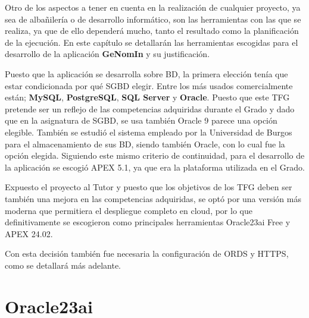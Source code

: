 
Otro de los aspectos a tener en cuenta en la realización de cualquier proyecto, ya sea de albañilería o de desarrollo informático, son las herramientas con las que se realiza, ya que de ello dependerá mucho, tanto el resultado como la planificación de la ejecución.
En este capítulo se detallarán las herramientas escogidas para el desarrollo de la aplicación \textbf{GeNomIn} y su justificación.

Puesto que la aplicación se desarrolla sobre BD, la primera elección tenía que estar condicionada por qué \acrshort{SGBD} elegir. Entre los más usados comercialmente están; \textbf{MySQL}, \textbf{PostgreSQL}, \textbf{SQL Server} y \textbf{Oracle}. Puesto que este \acrshort{TFG} pretende ser un reflejo de las competencias adquiridas durante el Grado y dado que en la asignatura de \acrshort{SGBD}, se usa también Oracle 9 parece una opción elegible. También se estudió el sistema empleado por la Universidad de Burgos para el almacenamiento de sus BD, siendo también Oracle, con lo cual fue la opción elegida.
Siguiendo este mismo criterio de continuidad, para el desarrollo de la aplicación se escogió \acrshort{APEX} 5.1, ya que era la plataforma utilizada en el Grado.

Expuesto el proyecto al Tutor y puesto que los objetivos de los \acrshort{TFG} deben ser también una mejora en las competencias adquiridas, se optó por una versión más moderna que permitiera el despliegue completo en cloud, por lo que definitivamente se escogieron como principales herramientas Oracle23ai Free y \acrshort{APEX} 24.02.

Con esta decisión también fue necesaria la configuración de \acrshort{ORDS} y \acrshort{HTTPS}, como se detallará más adelante.
\newpage
\section{Oracle23ai}

